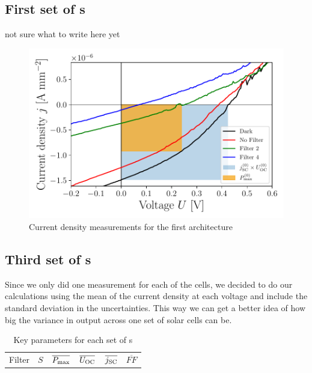 \subsection{First set of \BHSC s}

not sure what to write here yet

\begin{figure}[h]\centering
\includegraphics[width=\columnwidth]{../../../IV-Curve-Analysis/OSC1Graph.pdf}
\caption{Current density measurements for the first architecture}
\label{fig:OSC1Graph}
\end{figure}

\subsection{Third set of \BHSC s}

Since we only did one measurement for each of the cells, we decided to do our calculations using the mean of the current density at each voltage and include the standard deviation in the uncertainties. This way we can get a better idea of how big the variance in output across one set of solar cells can be.

\begin{table}[h]\centering
\caption{Key parameters for each set of \BHSC s}
\label{tab:keyparams}
\begin{tabular}{@{}cccccc@{}}\toprule
Filter & $S$ & $\overline{P_{\text{max}}}$ & $\overline{U_{\text{OC}}}$ & $\overline{j_{\text{SC}}}$ &$\overline{FF}$
\end{tabular}
\end{table}

